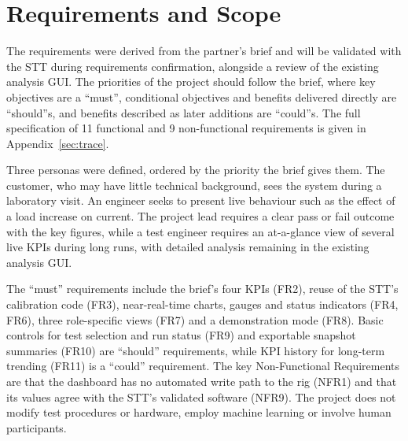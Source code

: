 \section{Requirements and Scope}
\label{sec:requirements}

The requirements were derived from the partner's brief and will be validated with the STT during requirements confirmation, alongside a review of the existing analysis GUI\@.
The priorities of the project should follow the brief, where key objectives are a ``must'', conditional objectives and benefits delivered directly are ``should''s, and benefits described as later additions are ``could''s.
The full specification of 11 functional and 9 non-functional requirements is given in Appendix~\ref{sec:trace}.

Three personas were defined, ordered by the priority the brief gives them.
The customer, who may have little technical background, sees the system during a laboratory visit.
An engineer seeks to present live behaviour such as the effect of a load increase on current.
The project lead requires a clear pass or fail outcome with the key figures, while a test engineer requires an at-a-glance view of several live KPIs during long runs, with detailed analysis remaining in the existing analysis GUI\@.

The ``must'' requirements include the brief's four KPIs (FR2), reuse of the STT's calibration code (FR3), near-real-time charts, gauges and status indicators (FR4, FR6), three role-specific views (FR7) and a demonstration mode (FR8).
Basic controls for test selection and run status (FR9) and exportable snapshot summaries (FR10) are ``should'' requirements, while KPI history for long-term trending (FR11) is a ``could'' requirement.
The key Non-Functional Requirements are that the dashboard has no automated write path to the rig (NFR1) and that its values agree with the STT's validated software (NFR9).
The project does not modify test procedures or hardware, employ machine learning or involve human participants.
